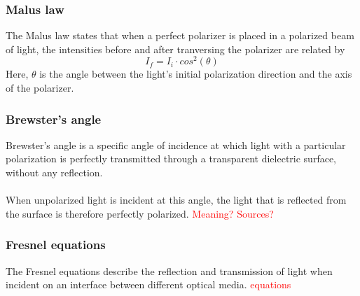 \subsubsection{Malus law}
The Malus law states that when a perfect polarizer is placed in a polarized
beam of light, the intensities before and after tranversing the polarizer
are related by
\begin{equation}
    I_f=I_i\cdot cos^2(\theta)
\end{equation}
Here, $\theta$ is the angle between the light's initial polarization
direction and the axis of the polarizer.

\subsubsection{Brewster's angle}
Brewster's angle is a specific angle of incidence at which light with a
particular polarization is perfectly transmitted through a transparent
dielectric surface, without any reflection. \\ \\ When unpolarized light
is incident at this angle, the light that is reflected from the surface is
therefore perfectly polarized. \textcolor{red}{Meaning? Sources?}

\subsubsection{Fresnel equations}
The Fresnel equations describe the reflection and transmission of light
when incident on an interface between different optical media.
\textcolor{red}{equations}

